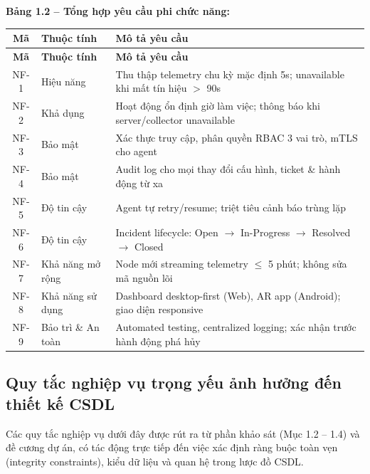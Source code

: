 \vspace{0.5em}
\noindent\textbf{Bảng 1.2 -- Tổng hợp yêu cầu phi chức năng:}

\vspace{0.3em}
\begin{longtable}{|c|p{2.8cm}|p{9.2cm}|}
\hline
\textbf{Mã} & \textbf{Thuộc tính} & \textbf{Mô tả yêu cầu} \\
\hline
\endfirsthead
\hline
\textbf{Mã} & \textbf{Thuộc tính} & \textbf{Mô tả yêu cầu} \\
\hline
\endhead
\hline
\endfoot
NF-1 & Hiệu năng & Thu thập telemetry chu kỳ mặc định 5s; unavailable khi mất tín hiệu $>$ 90s \\
\hline
NF-2 & Khả dụng & Hoạt động ổn định giờ làm việc; thông báo khi server/collector unavailable \\
\hline
NF-3 & Bảo mật & Xác thực truy cập, phân quyền RBAC 3 vai trò, mTLS cho agent \\
\hline
NF-4 & Bảo mật & Audit log cho mọi thay đổi cấu hình, ticket \& hành động từ xa \\
\hline
NF-5 & Độ tin cậy & Agent tự retry/resume; triệt tiêu cảnh báo trùng lặp \\
\hline
NF-6 & Độ tin cậy & Incident lifecycle: Open $\rightarrow$ In-Progress $\rightarrow$ Resolved $\rightarrow$ Closed \\
\hline
NF-7 & Khả năng mở rộng & Node mới streaming telemetry $\leq$ 5 phút; không sửa mã nguồn lõi \\
\hline
NF-8 & Khả năng sử dụng & Dashboard desktop-first (Web), AR app (Android); giao diện responsive \\
\hline
NF-9 & Bảo trì \& An toàn & Automated testing, centralized logging; xác nhận trước hành động phá hủy \\
\hline
\end{longtable}

\subsection{Quy tắc nghiệp vụ trọng yếu ảnh hưởng đến thiết kế CSDL}
Các quy tắc nghiệp vụ dưới đây được rút ra từ phần khảo sát (Mục 1.2 -- 1.4) và đề cương dự án, có tác động trực tiếp đến việc xác định ràng buộc toàn vẹn (integrity constraints), kiểu dữ liệu và quan hệ trong lược đồ CSDL.

